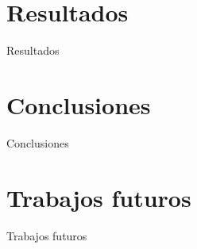 \documentclass[spanish]{beamer}
\begin{document}
\section{Resultados}
\begin{frame}{Resultados}
%
\end{frame}
%
\section{Conclusiones}
\begin{frame}{Conclusiones}
\end{frame}
%
\section{Trabajos futuros}
\begin{frame}{Trabajos futuros}
\end{frame}
\begin{frame}{}
\end{frame}
\end{document}
